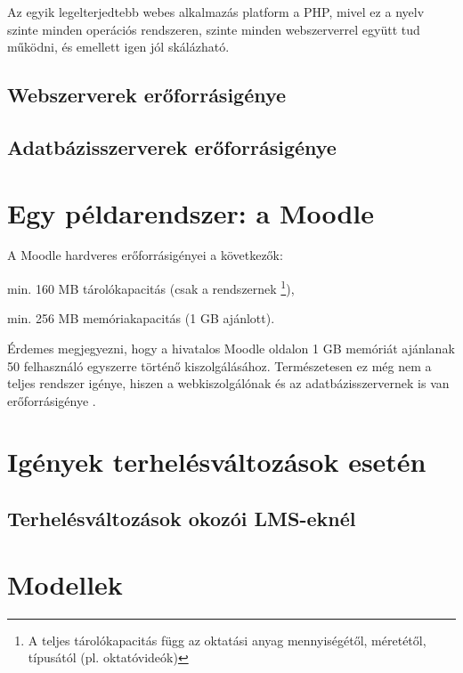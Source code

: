 Az egyik legelterjedtebb webes alkalmazás platform a PHP, mivel ez a nyelv szinte minden operációs rendszeren, szinte minden webszerverrel együtt tud működni, és emellett igen jól skálázható.

\subsection{Webszerverek erőforrásigénye}


\subsection{Adatbázisszerverek erőforrásigénye}


\section{Egy példarendszer: a Moodle}
A Moodle hardveres erőforrásigényei a következők:
\begin{sajat_itemize}
\item min. 160 MB tárolókapacitás (csak a rendszernek \footnote{A teljes tárolókapacitás függ az oktatási anyag mennyiségétől, méretétől, típusától (pl. oktatóvideók)}),
\item min. 256 MB memóriakapacitás (1 GB ajánlott).
\end{sajat_itemize}
Érdemes megjegyezni, hogy a hivatalos Moodle oldalon 1 GB memóriát ajánlanak 50 felhasználó egyszerre történő kiszolgálásához.
Természetesen ez még nem a teljes rendszer igénye, hiszen a webkiszolgálónak és az adatbázisszervernek is van erőforrásigénye \cite{moodleinst}.
 


\section{Igények terhelésváltozások esetén}

\subsection{Terhelésváltozások okozói LMS-eknél}


\section{Modellek}

